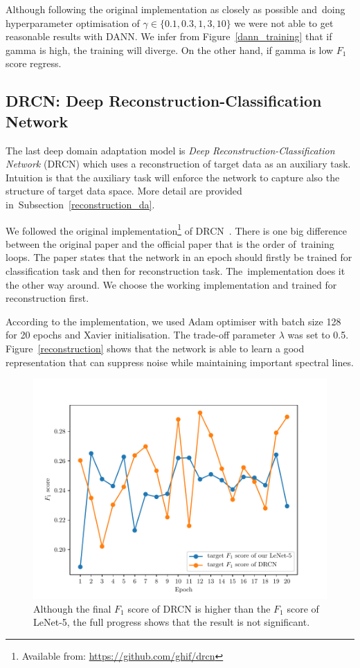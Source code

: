 Although following the original implementation as closely as possible
and~doing hyperparameter optimisation of \(\gamma \in \{0.1, 0.3, 1, 3, 10\}\)
we were not able to get reasonable results with DANN.
We infer from Figure~\ref{dann_training} that
if gamma is high, the training will diverge.
On the other hand, if gamma is low \(F_1\) score regress.

\subsection{DRCN: Deep Reconstruction-Classification Network}

The last deep domain adaptation model is \textit{Deep Reconstruction-Classification Network} (DRCN)
which uses a reconstruction of target data as an auxiliary task.
Intuition is that the auxiliary task will enforce the network to capture also the structure of target data space.
More detail are provided in~Subsection~\ref{reconstruction_da}.

We followed the original implementation\footnote{Available from: \url{https://github.com/ghif/drcn}} of DRCN~\cite{ghifary2016}.
There is one big difference between the original paper and the official paper
that is the order of~training loops.
The paper states that the network in an epoch
should firstly be trained for classification task
and then for reconstruction task.
The~implementation does it the other way around.
We choose the working implementation and trained for reconstruction first.

According to the implementation, we used Adam optimiser with batch size 128 for 20 epochs and Xavier initialisation.
The trade-off parameter \(\lambda\) was set to 0.5.
Figure~\ref{reconstruction} shows that the network is able to learn a good representation that can suppress noise
while maintaining important spectral lines.

\begin{figure}
\begin{center}
\includegraphics[width=.75\textwidth]{img/drcn_f1.pdf}
\end{center}
\caption[Comparison of \(F_1\) score of DRCN and LeNet-5]{
	Although the final \(F_1\) score of DRCN is higher than the \(F_1\) score of LeNet-5,
	the full progress shows that the result is not significant.
}
\label{drcn_f1}
\end{figure}

